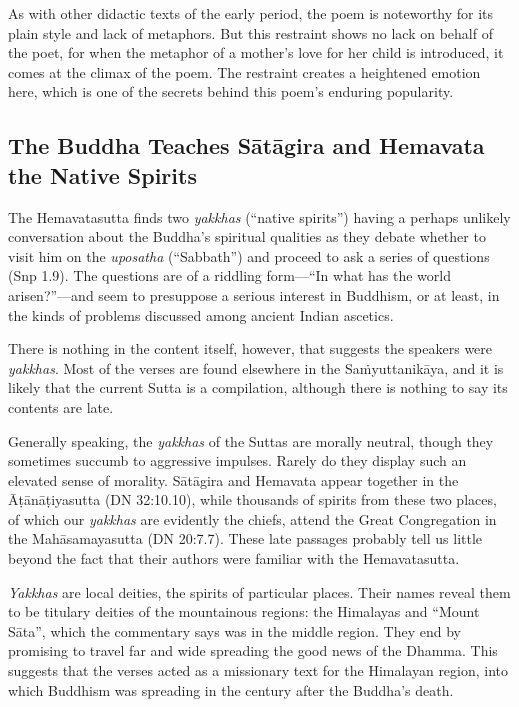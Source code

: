\documentclass[12pt,openany]{book}%
\begin{document}
As with other didactic texts of the early period, the poem is noteworthy for its plain style and lack of metaphors. But this restraint shows no lack on behalf of the poet, for when the metaphor of a mother’s love for her child is introduced, it comes at the climax of the poem. The restraint creates a heightened emotion here, which is one of the secrets behind this poem’s enduring popularity.

\subsection*{The Buddha Teaches \textsanskrit{Sātāgira} and Hemavata the Native Spirits}

The Hemavatasutta finds two \textit{yakkhas} (“native spirits”) having a perhaps unlikely conversation about the Buddha’s spiritual qualities as they debate whether to visit him on the \textit{uposatha} (“Sabbath”) and proceed to ask a series of questions (Snp 1.9). The questions are of a riddling form—“In what has the world arisen?”—and seem to presuppose a serious interest in Buddhism, or at least, in the kinds of problems discussed among ancient Indian ascetics.

There is nothing in the content itself, however, that suggests the speakers were \textit{yakkhas}. Most of the verses are found elsewhere in the \textsanskrit{Saṁyuttanikāya}, and it is likely that the current Sutta is a compilation, although there is nothing to say its contents are late.

Generally speaking, the \textit{yakkhas} of the Suttas are morally neutral, though they sometimes succumb to aggressive impulses. Rarely do they display such an elevated sense of morality. \textsanskrit{Sātāgira} and Hemavata appear together in the \textsanskrit{Āṭānāṭiyasutta} (DN 32:10.10), while thousands of spirits from these two places, of which our \textit{yakkhas} are evidently the chiefs, attend the Great Congregation in the \textsanskrit{Mahāsamayasutta} (DN 20:7.7). These late passages probably tell us little beyond the fact that their authors were familiar with the Hemavatasutta.

\textit{Yakkhas} are local deities, the spirits of particular places. Their names reveal them to be titulary deities of the mountainous regions: the Himalayas and “Mount \textsanskrit{Sāta}”, which the commentary says was in the middle region. They end by promising to travel far and wide spreading the good news of the Dhamma. This suggests that the verses acted as a missionary text for the Himalayan region, into which Buddhism was spreading in the century after the Buddha’s death.
\end{document}

